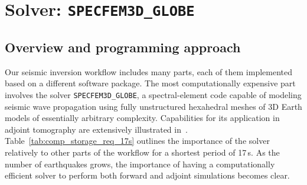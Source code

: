 \section{Solver: \texttt{SPECFEM3D\_GLOBE}}
\label{sec:solver}

\subsection{Overview and programming approach}

Our seismic inversion workflow includes many parts, each of them
implemented based on a different software package. The most computationally expensive
part involves the solver \texttt{SPECFEM3D\_GLOBE}, a spectral-element code capable of
modeling seismic wave propagation using fully unstructured hexahedral meshes of 3D
Earth models of essentially arbitrary complexity. Capabilities for its application
in adjoint tomography are extensively illustrated in~\cite{Peter2011}.
Table~\ref{tab:comp_storage_req_17s} outlines the importance of the solver
relatively to other parts of the workflow for a shortest period of 17\,s. As the
number of earthquakes grows, the importance of having a computationally
efficient solver to perform both forward and adjoint simulations becomes clear.

